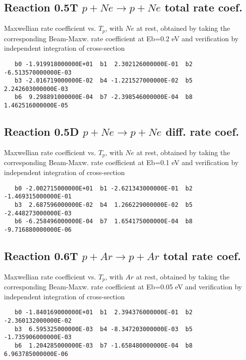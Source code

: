 \documentclass[12pt,dvipdfmx]{article}
\begin{document}
\subsection{
Reaction 0.5T  $p + Ne \rightarrow p + Ne$ total rate coef.
}
Maxwellian rate coefficient vs. $T_{p}$, with $Ne$ at rest, obtained by taking
the corresponding Beam-Maxw. rate coefficient at Eb=0.2 eV and
verification by independent integration of cross-section
\begin{small}\begin{verbatim}
   b0 -1.919918000000E+01  b1  2.302126000000E-01  b2 -6.513570000000E-03
   b3 -2.016719000000E-02  b4 -1.221527000000E-02  b5  2.242603000000E-03
   b6  9.298891000000E-04  b7 -2.398546000000E-04  b8  1.462516000000E-05
\end{verbatim}\end{small}


\subsection{
Reaction 0.5D  $p + Ne \rightarrow p + Ne$ diff. rate coef.
}
Maxwellian rate coefficient vs. $T_{p}$, with $Ne$ at rest, obtained by taking
the corresponding Beam-Maxw. rate coefficient at Eb=0.1 eV and
verification by independent integration of cross-section
\begin{small}\begin{verbatim}
   b0 -2.002715000000E+01  b1 -2.621343000000E-01  b2 -1.469315000000E-01
   b3  2.687596000000E-02  b4  1.266229000000E-02  b5 -2.448273000000E-03
   b6 -6.258496000000E-04  b7  1.654175000000E-04  b8 -9.716880000000E-06
\end{verbatim}\end{small}

\subsection{
Reaction 0.6T  $p + Ar \rightarrow p + Ar$ total rate coef.
}
Maxwellian rate coefficient vs. $T_{p}$, with $Ar$ at rest, obtained by taking
the corresponding Beam-Maxw. rate coefficient at Eb=0.05 eV and
verification by independent integration of cross-section
\begin{small}\begin{verbatim}
   b0 -1.840169000000E+01  b1  2.394376000000E-01  b2 -2.360132000000E-02
   b3  6.595325000000E-03  b4 -8.347203000000E-03  b5 -1.735906000000E-03
   b6  1.204285000000E-03  b7 -1.658480000000E-04  b8  6.963785000000E-06
\end{verbatim}\end{small}
\end{document}
